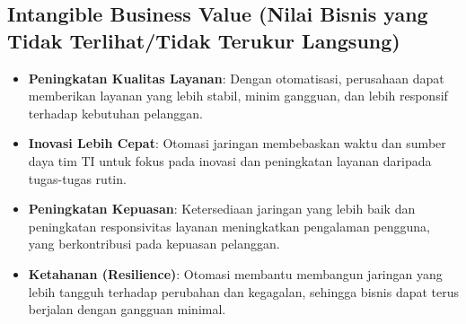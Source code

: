 \subsection{Intangible Business Value (Nilai Bisnis yang Tidak Terlihat/Tidak Terukur Langsung)}
\begin{itemize}
    \item \textbf{Peningkatan Kualitas Layanan}: Dengan otomatisasi, perusahaan dapat memberikan layanan yang lebih stabil, minim gangguan, dan lebih responsif terhadap kebutuhan pelanggan.
    \item \textbf{Inovasi Lebih Cepat}: Otomasi jaringan membebaskan waktu dan sumber daya tim TI untuk fokus pada inovasi dan peningkatan layanan daripada tugas-tugas rutin.
    \item \textbf{Peningkatan Kepuasan}: Ketersediaan jaringan yang lebih baik dan peningkatan responsivitas layanan meningkatkan pengalaman pengguna, yang berkontribusi pada kepuasan pelanggan.
    \item \textbf{Ketahanan (Resilience)}: Otomasi membantu membangun jaringan yang lebih tangguh terhadap perubahan dan kegagalan, sehingga bisnis dapat terus berjalan dengan gangguan minimal.
\end{itemize}

